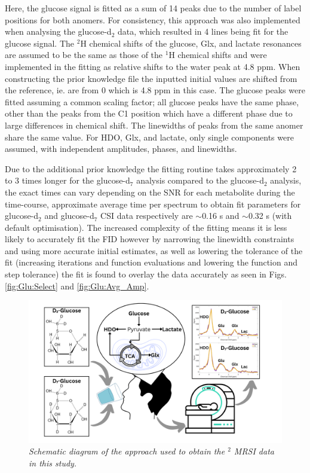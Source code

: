 Here, the glucose signal is fitted as a sum of 14 peaks due to the number of label positions for both anomers. For consistency, this approach was also implemented when analysing the glucose-d$_2$ data, which resulted in 4 lines being fit for the glucose signal. The $^2$H chemical shifts of the glucose, Glx, and lactate resonances are assumed to be the same as those of the $^1$H chemical shifts \cite{Govindaraju2000ProtonMetabolites} and were implemented in the fitting as relative shifts to the water peak \cite{Meerwaldt2023InImaging} at 4.8 ppm. When constructing the prior knowledge file the inputted initial values are shifted from the reference, ie. are from 0 which is 4.8 ppm in this case. The glucose peaks were fitted assuming a common scaling factor; all glucose peaks have the same phase, other than the peaks from the C1 position which have a different phase due to large differences in chemical shift. The linewidths of peaks from the same anomer share the same value. For \ac{HDO}, Glx, and lactate, only single components were assumed, with independent amplitudes, phases, and linewidths.

Due to the additional prior knowledge the fitting routine takes approximately 2 to 3 times longer for the glucose-d$_7$ analysis compared to the glucose-d$_2$ analysis, the exact times can vary depending on the SNR for each metabolite during the time-course, approximate average time per spectrum to obtain fit parameters for glucose-d$_2$ and glucose-d$_7$ \ac{CSI} data respectively are $\sim$0.16 s and $\sim$0.32 s (with default optimisation). The increased complexity of the fitting means it is less likely to accurately fit the \ac{FID} however by narrowing the linewidth constraints and using more accurate initial estimates, as well as lowering the tolerance of the fit (increasing iterations and function evaluations and lowering the function and step tolerance) the fit is found to overlay the data accurately as seen in Figs. \ref{fig:Glu:Select} and \ref{fig:Glu:Avg_Amp}. 

\begin{figure}
    \centering
    \includegraphics[width = 1\textwidth]{Figures/Glucose/Study_Day.png}
    \caption{\textit{Schematic diagram of the approach used to obtain the $^2$ MRSI data in this study.}}
    \label{fig:Glu:Study_Day}
\end{figure}

